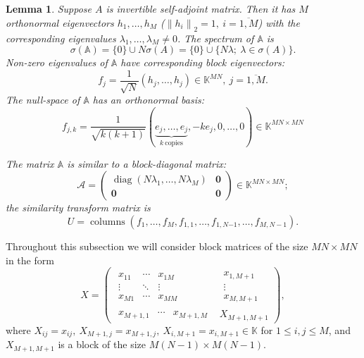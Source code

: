 \documentclass[a4paper]{jpconf}
\newtheorem{nkjpcslem}{Lemma}
\begin{document}
\begin{nkjpcslem}
    Suppose \( A \) is invertible self-adjoint matrix.
    Then it has \( M \) orthonormal eigenvectors \( h_1, \ldots, h_M \)
    (\(\left\|h_i\right\|_2 = 1,\ i{=}\overline{1,M}\))
    with the corresponding eigenvalues
    \( \lambda_1, \ldots, \lambda_M \neq 0\).
    The spectrum of \( \mathbb{A} \) is
    \[
        \sigma(\mathbb{A}) = \{0\}\cup N\sigma(A) = \{0\} \cup \{N\lambda;\ \lambda\in\sigma(A) \}.
    \]
    Non-zero eigenvalues of \( \mathbb{A} \)
        have corresponding block eigenvectors:
    \[
        f_j = \frac{1}{\sqrt{N}} (h_j, \ldots, h_j)\in \mathbb{K}^{MN},\ j=\overline{1,M}.
    \]
    The null-space of \( \mathbb{A} \)
        has an orthonormal basis:
    \[
        f_{j,k} = \frac{1}{\sqrt{k(k+1)}}
        (
        \underbrace{e_j, \ldots, e_j}_{k\ \text{copies}},
        -ke_j,
        0, \ldots, 0
        ) \in\mathbb{K}^{{MN}{\times}{MN}}
    \]

    The matrix \( \mathbb{A} \) is similar to a block-diagonal matrix:
    \[
        \mathcal{A} =
        \left(\begin{array}{c|c}
            \operatorname{diag}(N\lambda_1,\ldots,N\lambda_M) & \mathbf{0} \\ \hline
            \mathbf{0} & \mathbf{0}
        \end{array}\right)\in\mathbb{K}^{{MN}{\times}{MN}};
    \]
    the similarity transform matrix is
    \[
        U = \operatorname{columns}
        \left(f_1, \ldots, f_M, f_{1,1}, \ldots, f_{1,N{-1}}, \ldots, f_{M,N{-}1}\right).
    \]
\end{nkjpcslem}

Throughout this subsection
    we will consider block matrices
    of the size \( {MN}{\times}{MN} \)
    in the form
    \[
    X =
        \left(\begin{array}{c|c}
            \begin{matrix}
                x_{11} & \cdots & x_{1M} \\
                \vdots & \ddots & \vdots \\
                x_{M1} & \cdots & x_{MM}
            \end{matrix} &
            \begin{matrix}
                x_{1,M+1} \\
                \vdots \\
                x_{M,M+1}
            \end{matrix} \\ \hline
            \begin{matrix}
                x_{M+1,1} &
                \cdots &
                x_{M+1,M}
            \end{matrix} &
            X_{M+1,M+1}
        \end{array}\right),
    \]
where
\( X_{ij}      {=} x_{ij},
 \ X_{M{+}1,j} {=} x_{M{+}1,j},
 \ X_{i,M{+}1} {=} x_{i,M{+}1} \in \mathbb{K} \)
for \( 1 \leq {i,j} \leq M \),
and
\( X_{M{+}1,M{+}1} \) is a block of the size \( {M(N{-}1){\times}M(N-1)} \).
\end{document}
